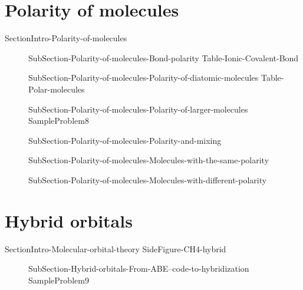 \documentclass[main.tex]{subfiles}
\begin{document}
\section{Polarity of molecules}{SectionIntro-Polarity-of-molecules}
\sloppy \begin{description}
\item[] {SubSection-Polarity-of-molecules-Bond-polarity}
{Table-Ionic-Covalent-Bond}
\item[] {SubSection-Polarity-of-molecules-Polarity-of-diatomic-molecules}
{Table-Polar-molecules}
\item[] {SubSection-Polarity-of-molecules-Polarity-of-larger-molecules}
{SampleProblem8}
\item[] {SubSection-Polarity-of-molecules-Polarity-and-mixing}
\item[] {SubSection-Polarity-of-molecules-Molecules-with-the-same-polarity}
\item[] {SubSection-Polarity-of-molecules-Molecules-with-different-polarity}
\end{description}




\section{Hybrid orbitals}{SectionIntro-Molecular-orbital-theory}
{SideFigure-CH4-hybrid}
\sloppy \begin{description}
\item[] {SubSection-Hybrid-orbitals-From-ABE--code-to-hybridization}
{SampleProblem9}

\end{description}
\end{document}
